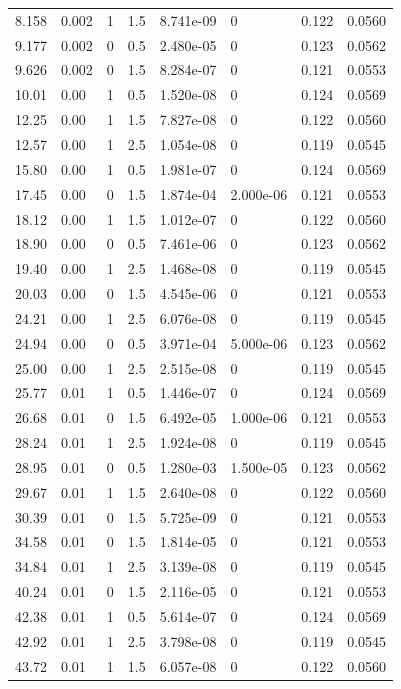 \documentclass[preview]{standalone}
\begin{document}
{{\begin{tabular}{L{1.2cm}C{1.2cm} C{0.3cm}C{0.5cm} C{1.4cm}C{1.4cm} C{1.4cm}C{1.4cm}}
  8.158  &  0.002  & 1     & 1.5 &  8.741e-09  & 0  & 0.122 &  0.0560   \\ 
  9.177  &  0.002  & 0     & 0.5 &  2.480e-05  & 0  & 0.123 &  0.0562   \\ 
  9.626  &  0.002  & 0     & 1.5 &  8.284e-07  & 0  & 0.121 &  0.0553   \\ 
  10.01  &  0.00  & 1     & 0.5 &  1.520e-08  & 0  & 0.124 &  0.0569   \\ 
  12.25  &  0.00  & 1     & 1.5 &  7.827e-08  & 0  & 0.122 &  0.0560   \\ 
  12.57  &  0.00  & 1     & 2.5 &  1.054e-08  & 0  & 0.119 &  0.0545   \\ 
  15.80  &  0.00  & 1     & 0.5 &  1.981e-07  & 0  & 0.124 &  0.0569   \\ 
  17.45  &  0.00  & 0     & 1.5 &  1.874e-04  & 2.000e-06  & 0.121 &  0.0553   \\ 
  18.12  &  0.00  & 1     & 1.5 &  1.012e-07  & 0  & 0.122 &  0.0560   \\ 
  18.90  &  0.00  & 0     & 0.5 &  7.461e-06  & 0  & 0.123 &  0.0562   \\ 
  19.40  &  0.00  & 1     & 2.5 &  1.468e-08  & 0  & 0.119 &  0.0545   \\ 
  20.03  &  0.00  & 0     & 1.5 &  4.545e-06  & 0  & 0.121 &  0.0553   \\ 
  24.21  &  0.00  & 1     & 2.5 &  6.076e-08  & 0  & 0.119 &  0.0545   \\ 
  24.94  &  0.00  & 0     & 0.5 &  3.971e-04  & 5.000e-06  & 0.123 &  0.0562   \\ 
  25.00  &  0.00  & 1     & 2.5 &  2.515e-08  & 0  & 0.119 &  0.0545   \\ 
  25.77  &  0.01  & 1     & 0.5 &  1.446e-07  & 0  & 0.124 &  0.0569   \\ 
  26.68  &  0.01  & 0     & 1.5 &  6.492e-05  & 1.000e-06  & 0.121 &  0.0553   \\ 
  28.24  &  0.01  & 1     & 2.5 &  1.924e-08  & 0  & 0.119 &  0.0545   \\ 
  28.95  &  0.01  & 0     & 0.5 &  1.280e-03  & 1.500e-05  & 0.123 &  0.0562   \\ 
  29.67  &  0.01  & 1     & 1.5 &  2.640e-08  & 0  & 0.122 &  0.0560   \\ 
  30.39  &  0.01  & 0     & 1.5 &  5.725e-09  & 0  & 0.121 &  0.0553   \\ 
  34.58  &  0.01  & 0     & 1.5 &  1.814e-05  & 0  & 0.121 &  0.0553   \\ 
  34.84  &  0.01  & 1     & 2.5 &  3.139e-08  & 0  & 0.119 &  0.0545   \\ 
  40.24  &  0.01  & 0     & 1.5 &  2.116e-05  & 0  & 0.121 &  0.0553   \\ 
  42.38  &  0.01  & 1     & 0.5 &  5.614e-07  & 0  & 0.124 &  0.0569   \\ 
  42.92  &  0.01  & 1     & 2.5 &  3.798e-08  & 0  & 0.119 &  0.0545   \\ 
  43.72  &  0.01  & 1     & 1.5 &  6.057e-08  & 0  & 0.122 &  0.0560   \\ 
\hline 
\end{tabular} 

}}
\end{document}
